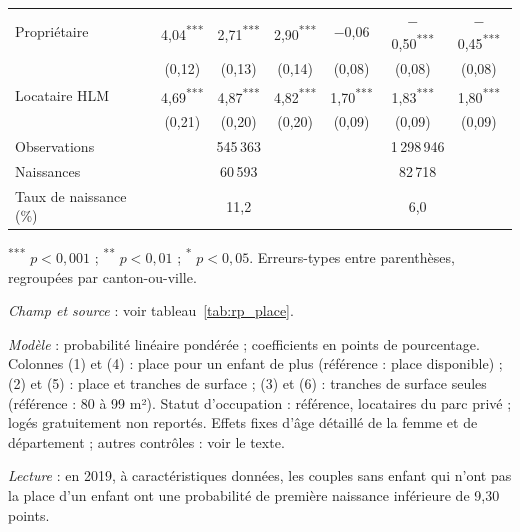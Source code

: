 \documentclass[11pt,a4paper]{article}
\theoremstyle{plain}
\theoremstyle{definition}
\theoremstyle{remark}
\newcommand{\sym}[1]{\textsuperscript{#1}}
\begin{document}
\begin{table}[p]
\begin{threeparttable}
\begin{tabular}{@{}lcccccc@{}}
Propriétaire & 4,04\sym{***} & 2,71\sym{***} & 2,90\sym{***} & $-$0,06 & $-$0,50\sym{***} & $-$0,45\sym{***} \\
  & (0,12) & (0,13) & (0,14) & (0,08) & (0,08) & (0,08) \\
Locataire HLM & 4,69\sym{***} & 4,87\sym{***} & 4,82\sym{***} & 1,70\sym{***} & 1,83\sym{***} & 1,80\sym{***} \\
  & (0,21) & (0,20) & (0,20) & (0,09) & (0,09) & (0,09) \\
Observations & \multicolumn{3}{c}{545\,363} & \multicolumn{3}{c}{1\,298\,946} \\
Naissances & \multicolumn{3}{c}{60\,593} & \multicolumn{3}{c}{82\,718} \\
Taux de naissance (\%) & \multicolumn{3}{c}{11,2} & \multicolumn{3}{c}{6,0} \\
\bottomrule
\end{tabular}
\begin{tablenotes}\scriptsize
\item \sym{***} $p<0{,}001$ ; \sym{**} $p<0{,}01$ ; \sym{*} $p<0{,}05$. Erreurs-types entre parenthèses, regroupées par canton-ou-ville.
\item \textit{Champ et source} : voir tableau~\ref{tab:rp_place}.
\item \textit{Modèle} : probabilité linéaire pondérée ; coefficients en points de pourcentage. Colonnes (1) et (4) : place pour un enfant de plus (référence : place disponible) ; (2) et (5) : place et tranches de surface ; (3) et (6) : tranches de surface seules (référence : 80 à 99 m²). Statut d'occupation : référence, locataires du parc privé ; logés gratuitement non reportés. Effets fixes d'âge détaillé de la femme et de département ; autres contrôles : voir le texte.
\item \textit{Lecture} : en 2019, à caractéristiques données, les couples sans enfant qui n'ont pas la place d'un enfant ont une probabilité de première naissance inférieure de 9,30 points.
\end{tablenotes}
\end{threeparttable}
\end{table}
\end{document}
